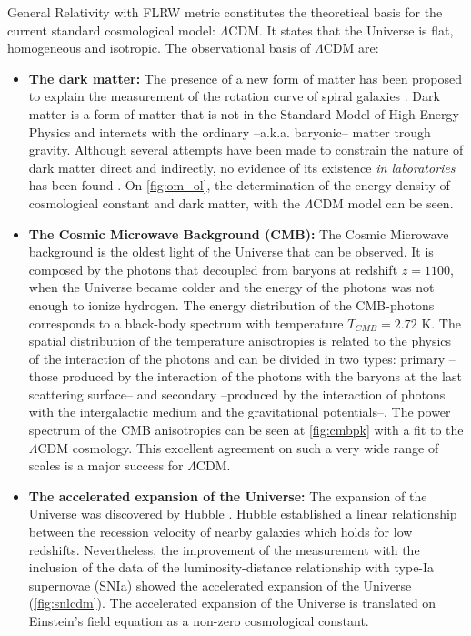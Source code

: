 General Relativity with FLRW metric constitutes the theoretical basis for the current standard cosmological model: $\Lambda$CDM. It states that the Universe is flat, homogeneous and isotropic. The observational basis of $\Lambda$CDM are:
\begin{itemize}
\item {\bf The dark matter:} The presence of a new form of matter has been proposed to explain the measurement of the rotation curve of spiral galaxies \cite{1982ApJ...253...70B,1983Sci...220.1339R,1985ApJ...297..423B,1985ApJ...289...81R}. Dark matter is a form of matter that is not in the Standard Model of High Energy Physics and interacts with the ordinary --a.k.a. baryonic-- matter trough gravity. Although several attempts have been made to constrain the nature of dark matter direct and indirectly, no evidence of its existence {\it in laboratories} has been found  \cite{2016JPhG...43a3001M,2016ConPh..57..496G}. On \autoref{fig:om_ol}, the determination of the energy density of cosmological constant and dark matter, with the $\Lambda$CDM model can be seen.

\item {\bf The Cosmic Microwave Background (CMB):} The Cosmic Microwave background is the oldest light of the Universe that can be observed. It is composed by the photons that decoupled from baryons at redshift $z=1100$, when the Universe became colder and the energy of the photons was not enough to ionize hydrogen. The energy distribution of the CMB-photons corresponds to a black-body spectrum with temperature $T_{CMB}=2.72$ K. The spatial distribution of the temperature anisotropies is related to the physics of the interaction of the photons and can be divided in two types: primary --those produced by the interaction of the photons with the baryons at the last scattering surface-- and secondary --produced by the interaction of photons with the intergalactic medium and the gravitational potentials--. The power spectrum of the CMB anisotropies can be seen at \autoref{fig:cmbpk} with a fit to the $\Lambda$CDM cosmology. This excellent agreement on such a very wide range of scales is a major success for $\Lambda$CDM.

\item {\bf The accelerated expansion of the Universe:} The expansion of the Universe was discovered by Hubble \cite{1929PNAS...15..168H}. Hubble established a linear relationship between the recession velocity of nearby galaxies which holds for low redshifts. Nevertheless, the improvement of the measurement with the inclusion of the data of the luminosity-distance relationship with type-Ia supernovae (SNIa) showed the accelerated expansion of the Universe \cite{1999ApJ...517..565P} (\autoref{fig:snlcdm}). The accelerated expansion of the Universe is translated on Einstein's field equation as a non-zero cosmological constant.


\end{itemize}
